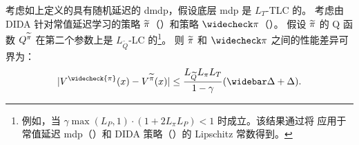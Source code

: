 \begin{thm}
\label{thm:stoch_mdp_dida_bound}
    考虑如上定义的具有随机延迟的 \gls{dmdp}，假设底层 \gls{mdp} 是 $L_T$-TLC 的。
    考虑由 DIDA 针对常值延迟学习的策略 ${\widetilde{\pi}}$（）和策略 $\widecheck\pi$（）。
    假设 ${\widetilde{\pi}}$ 的 Q 函数 $Q^{\widetilde{\pi}}$ 在第二个参数上是 $L_{\widetilde Q}$-LC 的\footnote{例如，当 $\gamma\max(L_P,1)\cdot(1+2L_\pi L_P)<1$ 时成立。该结果通过将 \cite[Theorem~1]{rachelson2010locality} 应用于常值延迟 \gls{mdp}（）和 DIDA 策略（）的 Lipschitz 常数得到。}。
    则 ${\widetilde{\pi}}$ 和 $\widecheck\pi$ 之间的性能差异可界为：
    \begin{align*}
        \lvert V^{\widecheck{\pi}}(x)- V^{\delayedpolicy}(x)\rvert \le \frac{L_{\widetilde Q} L_\pi L_T }{1-\gamma}(\widebar\delay+\delay).
    \end{align*}
\end{thm}
